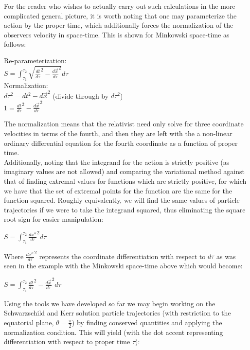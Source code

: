 \documentclass[]{article}
\begin{document}
For the reader who wishes to actually carry out such calculations in the more complicated general picture, it is worth noting that one may parameterize the action by the proper time, which additionally forces the normalization of the observers velocity in space-time. This is shown for Minkowski space-time as follows:

\begin{center}
	Re-parameterization: \\
	$S = \int_{\tau_1}^{\tau_2}
		\sqrt{\frac{dt}{d\tau}^2 - \frac{d\vec{x}}{d\tau}^2} d\tau$ \\
	Normalization: \\
	$d \tau^2 = dt^2 -d\vec{x}^2$ (divide through by $d\tau^2$) \\
	$1 = \frac{dt}{d\tau}^2 - \frac{d\vec{x}}{d\tau}^2$
\end{center}

The normalization means that the relativist need only solve for three coordinate velocities in terms of the fourth, and then they are left with the a non-linear ordinary differential equation for the fourth coordinate as a function of proper time. \\

Additionally, noting that the integrand for the action is strictly positive (as imaginary values are not allowed) and comparing the variational method against that of finding extremal values for functions which are strictly positive, for which we have that the set of extremal points for the function are the same for the function squared. Roughly equivalently, we will find the same values of particle trajectories if we were to take the integrand squared, thus eliminating the square root sign for easier manipulation:

\begin{center}
	$S = \int_{\tau_1}^{\tau_2} \frac{dx^\alpha}{d\tau}^2 d\tau$
\end{center}

\noindent
Where $\frac{dx^\alpha}{d\tau}^2$ represents the coordinate differentiation with respect to $d\tau$ as was seen in the example with the Minkowski space-time above which would become:

\begin{center}
	$S = \int_{\tau_1}^{\tau_2}
	\frac{dt}{d\tau}^2 - \frac{d\vec{x}}{d\tau}^2 d\tau$ \\
\end{center}

Using the tools we have developed so far we may begin working on the Schwarzschild and Kerr solution particle trajectories (with restriction to the equatorial plane, $\theta = \frac{\pi}{2}$) by finding conserved quantities and applying the normalization condition. This will yield (with the dot accent representing differentiation with respect to proper time $\tau$):
\end{document}
